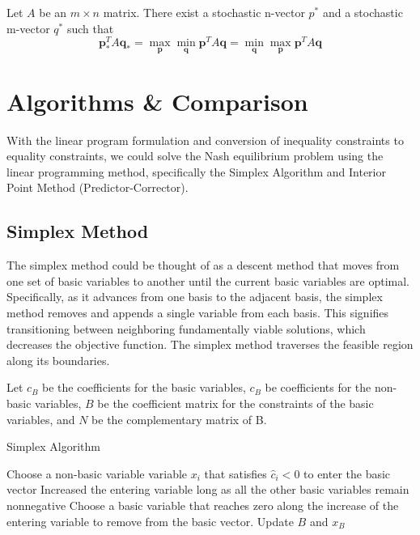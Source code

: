 \documentclass[journal, 11pt, a4paper, twoside]{IEEEtran}
\begin{document}
    \begin{theorem}
        Let $A$ be an $m \times n$ matrix. There exist a stochastic n-vector 
        $p^{*}$ and a stochastic m-vector $q^{*}$ such that 
        \[
        \bm{p}^T_*A\bm{q}_* = \max_{\bm{p}}\min_{\bm{q}} \bm{p}^TA\bm{q} = \min_{\bm{q}}\max_{\bm{p}} \bm{p}^TA\bm{q}
        \]
    \end{theorem}


\section{Algorithms \& Comparison}
With the linear program formulation and conversion of inequality constraints to equality constraints, we could solve the Nash equilibrium problem using the linear programming method, specifically the Simplex Algorithm and Interior Point Method (Predictor-Corrector).
\subsection{Simplex Method}
The simplex method could be thought of as a descent method that moves from one set of basic variables to another until the current basic variables are optimal. Specifically, as it advances from one basis to the adjacent basis, the simplex method removes and appends a single variable from each basis. This signifies transitioning between neighboring fundamentally viable solutions, which decreases the objective function. The simplex method traverses the feasible region along its boundaries.  

Let $c_{B}$ be the coefficients for the basic variables, $c_{B}$ be coefficients for the non-basic variables, $B$ be the coefficient matrix for the constraints of the basic variables, and $N$ be the complementary matrix of B.
\begin{algorithm}[!htb]
    \caption{Simplex Algorithm}
    \begin{algorithmic}
        \State Choose a non-basic variable variable $x_i$ that satisfies $\hat{c}_i<0$ to enter the basic vector
        \State Increased the entering variable long as all the other basic variables remain nonnegative
        \State Choose a basic variable that reaches zero along the increase of the entering variable to remove from the basic vector.
        \State Update $B$ and $x_B$
    \EndWhile
    \end{algorithmic}
\end{algorithm} 
\end{document}
